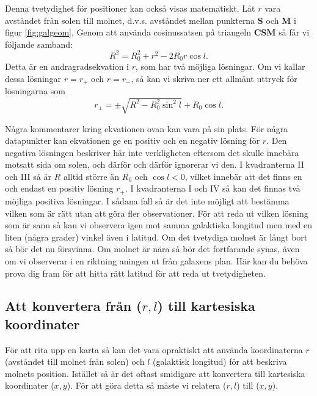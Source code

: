 Denna tvetydighet för positioner kan också visas matematiskt. Låt $r$ vara 
avståndet från solen till molnet, d.v.s. avståndet mellan punkterna {\bf
S} och {\bf M} i  figur \ref{fig:galgeom}. Genom att använda cosinussatsen
på triangeln {\bf CSM} så får vi följande samband:
\begin{equation}
R^2 = R_0^2 + r^2 - 2 R_0 r \cos l.
\end{equation}
Detta är en andragradsekvation i $r$, som har två möjliga lösningar. Om vi
kallar dessa lösningar $r=r_{+}$ och $r=r_{-}$, så kan vi skriva ner ett 
allmänt uttryck för lösningarna som 
\begin{equation}
\boxed{
r_\pm = \pm \sqrt{R^2 - R_0^2 \sin^2 l} + R_0\cos l .
}
\label{eqn:rpm}
\end{equation}

Några kommentarer kring ekvationen ovan kan vara på sin plats. För några
datapunkter kan ekvationen ge en positiv och en negativ lösning för $r$.  Den
negativa lösningen beskriver här inte verkligheten eftersom det skulle innebära
motsatt sida om solen, och därför och därför ignorerar vi den.  I kvadranterna
II och III så är $R$ alltid större än $R_0$ och $\cos l <0$, vilket innebär att
det finns en och endast en positiv lösning $r_+$.  I kvadranterna I och IV så
kan det finnas två möjliga positiva lösningar.  I sådana fall så är det inte
möjligt att bestämma vilken som är rätt utan att göra fler observationer. För
att reda ut vilken lösning som är sann så kan vi observera igen mot samma
galaktiska longitud men med en liten (några grader) vinkel även i latitud. Om
det tvetydiga molnet är långt bort så bör det nu försvinna. Om molnet är nära
så bör det fortfarande synas, även om vi observerar i en riktning aningen ut
från galaxens plan. Här kan du behöva prova dig fram för att hitta rätt latitud
för att reda ut tvetydigheten. 

\subsection{Att konvertera från ($r,l$) till kartesiska koordinater} 
För att rita upp en karta så kan det vara opraktiskt att använda koordinaterna
$r$ (avståndet till molnet från solen) och $l$ (galaktisk longitud) för att beskriva
molnets position. Istället så är det oftast smidigare att konvertera till kartesiska koordinater
($x,y$). För att göra detta så måste vi relatera ($r, l$) till ($x, y$). 

